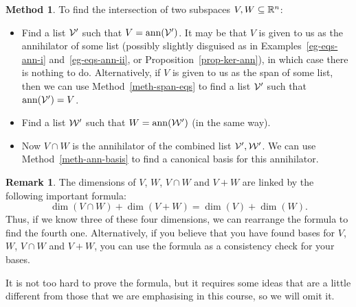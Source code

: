 \documentclass[reqno]{amsart}
\theoremstyle{definition}
\newtheorem{remark}[theorem]{Remark}
\newtheorem{method}[theorem]{Method}
\begin{document}
\begin{method}\label{meth-find-meet}
 To find the intersection of two subspaces $V,W\subseteq{\mathbb{R}}^n$:
 \begin{itemize}
  \item[(a)] Find a list $\mathcal{V}'$ such that $V=\operatorname{ann}(\mathcal{V}')$.  It may be
   that $V$ is given to us as the annihilator of some list (possibly
   slightly disguised as in Examples~\ref{eg-eqs-ann-i}
   and~\ref{eg-eqs-ann-ii}, or Proposition~\ref{prop-ker-ann}), in
   which case there is nothing to do.  Alternatively, if $V$ is given
   to us as the span of some list, then we can use
   Method~\ref{meth-span-eqs} to find a list $\mathcal{V}'$ such that
   $\operatorname{ann}(\mathcal{V}')=V$. 
  \item[(b)] Find a list $\mathcal{W}'$ such that $W=\operatorname{ann}(\mathcal{W}')$ (in the same
   way).
  \item[(c)] Now $V\cap W$ is the annihilator of the combined list
   $\mathcal{V}',\mathcal{W}'$.
   We can use Method~\ref{meth-ann-basis} to find a canonical basis
   for this annihilator.
 \end{itemize}
\end{method}

\begin{remark}\label{rem-dim-formula}
 The dimensions of $V$, $W$, $V\cap W$ and $V+W$ are linked by the
 following important formula:
 \[ \dim(V\cap W) + \dim(V+W) = \dim(V) + \dim(W). \]
 Thus, if we know three of these four dimensions, we can rearrange the
 formula to find the fourth one.  Alternatively, if you believe that
 you have found bases for $V$, $W$, $V\cap W$ and $V+W$, you can use
 the formula as a consistency check for your bases.

 It is not too hard to prove the formula, but it requires some ideas
 that are a little different from those that we are emphasising in
 this course, so we will omit it.
\end{remark}
\end{document}
